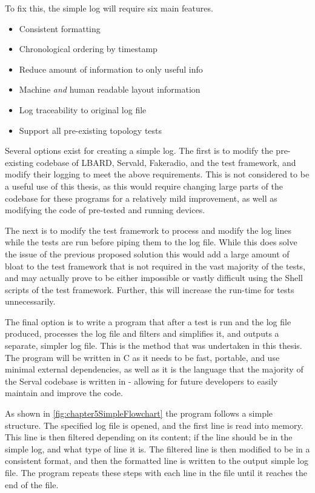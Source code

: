To fix this, the simple log will require six main features.
\begin{itemize}
    \item Consistent formatting
    \item Chronological ordering by timestamp
    \item Reduce amount of information to only useful info
    \item Machine \emph{and} human readable layout information
    \item Log traceability to original log file
    \item Support all pre-existing topology tests
\end{itemize}


Several options exist for creating a simple log.
The first is to modify the pre-existing codebase of LBARD, Servald, Fakeradio, and the test framework, and modify their logging to meet the above requirements.
This is not considered to be a useful use of this thesis, as this would require changing large parts of the codebase for these programs for a relatively mild improvement, as well as modifying the code of pre-tested and running devices.

The next is to modify the test framework to process and modify the log lines while the tests are run before piping them to the log file.
While this does solve the issue of the previous proposed solution this would add a large amount of bloat to the test framework that is not required in the vast majority of the tests, and may actually prove to be either impossible or vastly difficult using the Shell scripts of the test framework.
Further, this will increase the run-time for tests unnecessarily.

The final option is to write a program that after a test is run and the log file produced, processes the log file and filters and simplifies it, and outputs a separate, simpler log file. 
This is the method that was undertaken in this thesis. 
The program will be written in C as it needs to be fast, portable, and use minimal external dependencies, as well as it is the language that the majority of the Serval codebase is written in - allowing for future developers to easily maintain and improve the code.

As shown in \figurename{ \ref{fig:chapter5SimpleFlowchart}} the program follows a simple structure.
The specified log file is opened, and the first line is read into memory.
This line is then filtered depending on its content; if the line should be in the simple log, and what type of line it is. 
The filtered line is then modified to be in a consistent format, and then the formatted line is written to the output simple log file.
The program repeats these steps with each line in the file until it reaches the end of the file.

